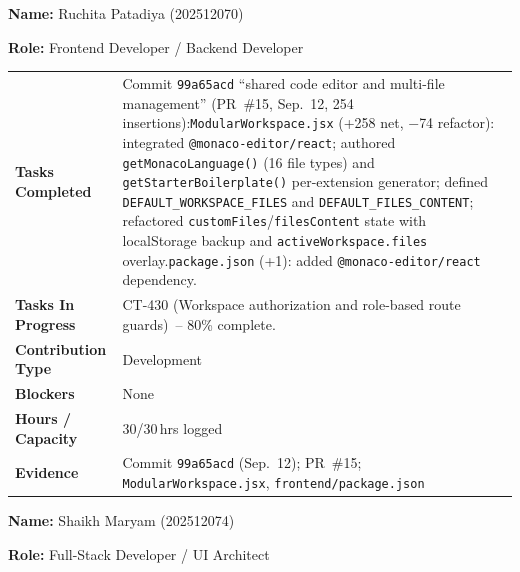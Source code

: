 \documentclass[11pt,a4paper]{article}
\newcommand{\field}[2]{\textbf{#1:} #2\par}
\begin{document}
\vspace{6pt}

\field{Name}{Ruchita Patadiya (202512070)}
\field{Role}{Frontend Developer / Backend Developer}

\vspace{4pt}

{\small
\begin{tabular}{>{\bfseries}p{} p{}}
\toprule
Tasks Completed & Commit \texttt{99a65acd} ``shared code editor and multi-file management'' (PR~\#15, Sep.\ 12, 254 insertions):\newline \texttt{ModularWorkspace.jsx} (+258 net, $-$74 refactor): integrated \texttt{@monaco-editor/react}; authored \texttt{getMonacoLanguage()} (16 file types) and \texttt{getStarterBoilerplate()} per-extension generator; defined \texttt{DEFAULT\_WORKSPACE\_FILES} and \texttt{DEFAULT\_FILES\_CONTENT}; refactored \texttt{customFiles}/\texttt{filesContent} state with localStorage backup and \texttt{activeWorkspace.files} overlay.\newline \texttt{package.json} (+1): added \texttt{@monaco-editor/react} dependency. \\
Tasks In Progress & CT-430 (Workspace authorization and role-based route guards)~-- 80\% complete. \\
Contribution Type & Development \\
Blockers & None \\
Hours / Capacity & 30/30\,hrs logged \\
Evidence & Commit \texttt{99a65acd} (Sep.\ 12); PR~\#15; \texttt{ModularWorkspace.jsx}, \texttt{frontend/package.json} \\
\bottomrule
\end{tabular}
}

\vspace{6pt}

\field{Name}{Shaikh Maryam (202512074)}
\field{Role}{Full-Stack Developer / UI Architect}

\vspace{4pt}
\end{document}

